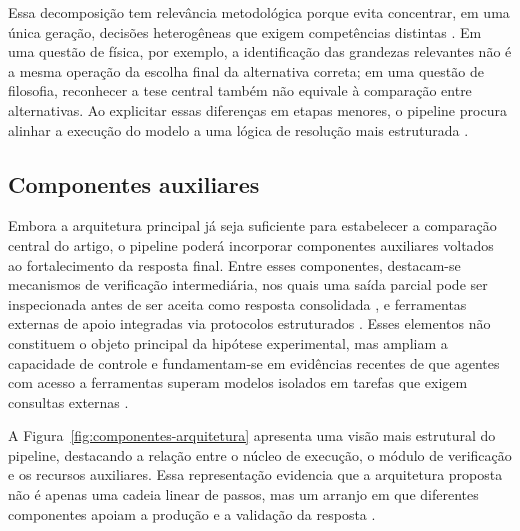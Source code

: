 \documentclass[a4paper,10pt,twocolumn]{article}
\begin{document}
Essa decomposição tem relevância metodológica porque evita concentrar, em uma única geração, decisões heterogêneas que exigem competências distintas \cite{wei2022chain,yao2023tree}. Em uma questão de física, por exemplo, a identificação das grandezas relevantes não é a mesma operação da escolha final da alternativa correta; em uma questão de filosofia, reconhecer a tese central também não equivale à comparação entre alternativas. Ao explicitar essas diferenças em etapas menores, o pipeline procura alinhar a execução do modelo a uma lógica de resolução mais estruturada \cite{madaan2023selfrefine,huttula2025advanced}.

\subsection{Componentes auxiliares}

Embora a arquitetura principal já seja suficiente para estabelecer a comparação central do artigo, o pipeline poderá incorporar componentes auxiliares voltados ao fortalecimento da resposta final. Entre esses componentes, destacam-se mecanismos de verificação intermediária, nos quais uma saída parcial pode ser inspecionada antes de ser aceita como resposta consolidada \cite{zheng2024judging,li2024llms_judges}, e ferramentas externas de apoio integradas via protocolos estruturados \cite{mcp_multiagent2025,sarkar2025mcp}. Esses elementos não constituem o objeto principal da hipótese experimental, mas ampliam a capacidade de controle e fundamentam-se em evidências recentes de que agentes com acesso a ferramentas superam modelos isolados em tarefas que exigem consultas externas \cite{shen2023hugginggpt,chen2025tumix}.

A Figura~\ref{fig:componentes-arquitetura} apresenta uma visão mais estrutural do pipeline, destacando a relação entre o núcleo de execução, o módulo de verificação e os recursos auxiliares. Essa representação evidencia que a arquitetura proposta não é apenas uma cadeia linear de passos, mas um arranjo em que diferentes componentes apoiam a produção e a validação da resposta \cite{ghuntley2025ralph,shinn2023reflexion}.
\end{document}
